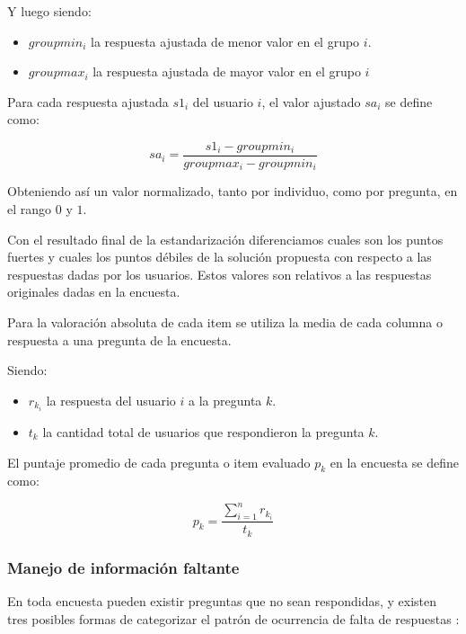 Y luego siendo:
\begin{itemize}
	\item $groupmin_i$ la respuesta ajustada de menor valor en el grupo $i$.
	\item $groupmax_i$ la respuesta ajustada de mayor valor en el grupo $i$
\end{itemize}

Para cada respuesta ajustada $s1_i$ del usuario $i$, el valor ajustado $sa_i$ se
define como:	

\begin{equation*}
sa_i=\frac{s1_i-groupmin_i}{groupmax_i-groupmin_i}
\end{equation*}

Obteniendo así un valor normalizado, tanto por individuo, como por pregunta, en
el rango $0$ y $1$.

Con el resultado final de la estandarización diferenciamos cuales son los
puntos fuertes y cuales los puntos débiles de la solución propuesta con
respecto a las respuestas dadas por los usuarios. Estos valores son relativos a
las respuestas originales dadas en la encuesta.

Para la valoración absoluta de cada  item se utiliza la media de cada columna o
respuesta a una pregunta de la encuesta.

Siendo:
\begin{itemize} 
\item $r_{k_i}$ la respuesta del usuario $i$ a la pregunta $k$.
\item $t_k$ la cantidad total de usuarios que respondieron la pregunta $k$.
\end{itemize}

El puntaje promedio de cada pregunta o item evaluado  $p_k$ en la encuesta se
define como:

\begin{equation*}
p_k = \frac{\sum_{i=1}^n{r_{k_i}}}{t_k}
\end{equation*}

\subsubsection{Manejo de información faltante}
\label{sec:informacion_faltante}

En toda encuesta pueden existir preguntas que no sean respondidas, y existen
tres posibles formas de categorizar el patrón de ocurrencia de falta de
respuestas\cite{leite2010performance}
\cite{leite2010performance}\cite{tsikriktsis2005review}:

